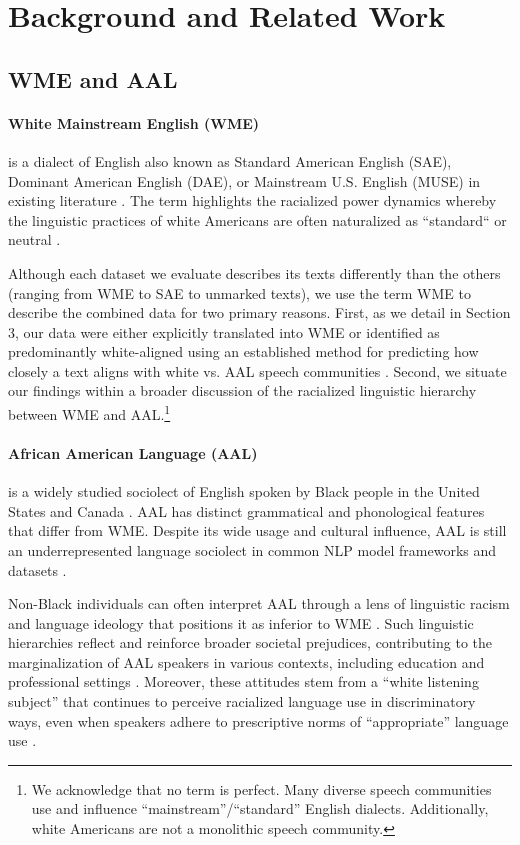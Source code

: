 \section{Background and Related Work}
\subsection{WME and AAL}
\paragraph{White Mainstream English (WME)} is a dialect of English also known as Standard American English (SAE), Dominant American English (DAE), or Mainstream U.S. English (MUSE) in existing literature \cite{rosa_unsettling_2017, alim2016, blodgett2021sociolinguistically}. The term highlights the racialized power dynamics whereby the linguistic practices of white Americans are often naturalized as ``standard`` or neutral \cite{baker2020linguistic, alim_articulate_2012}.

Although each dataset we evaluate describes its texts differently than the others (ranging from WME to SAE to unmarked texts), we use the term WME to describe the combined data for two primary reasons. First, as we detail in Section 3, our data were either explicitly translated into WME or identified as predominantly white-aligned using an established method for predicting how closely a text aligns with white vs. AAL speech communities \cite{blodgett_demographic_2016}. Second, we situate our findings within a broader discussion of the racialized linguistic hierarchy between WME and AAL.\footnote{We acknowledge that no term is perfect. Many diverse speech communities use and influence ``mainstream''/``standard'' English dialects. Additionally, white Americans are not a monolithic speech community.}

\paragraph{African American Language (AAL)} is a widely studied sociolect of English spoken by Black people in the United States and Canada \cite{green2002african, grieser2022black, baker2020linguistic}. AAL has distinct grammatical and phonological features that differ from WME. Despite its wide usage and cultural influence, AAL is still an underrepresented language sociolect in common NLP model frameworks and datasets \cite{dacon-2022-towards}. 

Non-Black individuals can often interpret AAL through a lens of linguistic racism and language ideology that positions it as inferior to WME \cite{spears1998}. Such linguistic hierarchies reflect and reinforce broader societal prejudices, contributing to the marginalization of AAL speakers in various contexts, including education and professional settings \cite{alim2016}. Moreover, these attitudes stem from a ``white listening subject'' that continues to perceive racialized language use in discriminatory ways, even when speakers adhere to prescriptive norms of ``appropriate'' language use \cite{spears1998, alim2016, rosa_unsettling_2017}.



